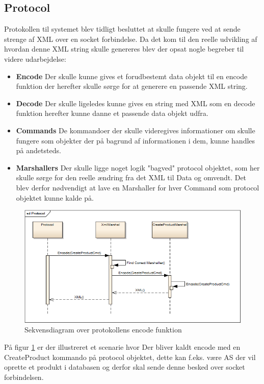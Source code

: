 \subsection{Protocol}\label{PROTOKOL}
Protokollen til systemet blev tidligt besluttet at skulle fungere ved at sende strenge af XML over en socket forbindelse. Da det kom til den reelle udvikling af hvordan denne XML string skulle genereres blev der opsat nogle begreber til videre udarbejdelse:

\begin{itemize}
\item \textbf{Encode} Der skulle kunne gives et forudbestemt data objekt til en encode funktion der herefter skulle sørge for at generere en passende XML string. 
\item \textbf{Decode} Der skulle ligeledes kunne gives en string med XML som en decode funktion herefter kunne danne et passende data objekt udfra. 
\item \textbf{Commands} De kommandoer der skulle videregives informationer om skulle fungere som objekter der på bagrund af informationen i dem, kunne handles på andetsteds.
\item \textbf{Marshallers} Der skulle ligge noget logik "bagved" protocol objektet, som her skulle sørge for den reelle ændring fra det XML til Data og omvendt. Det blev derfor nødvendigt at lave en Marshaller for hver Command som protocol objektet kunne kalde på.
\end{itemize}

\begin{figure}[H]
    \centering
    \includegraphics[width=1.0\textwidth]{Systemdesign/SharedLib/Images/Protokol/Protocol_Sek.png}
    \caption{Sekvensdiagram over protokollens encode funktion}
    \label{fig:protocolSek}
\end{figure}

På figur \ref{fig:protocolSek} er der illustreret et scenarie hvor Der bliver kaldt encode med en CreateProduct kommando på protocol objektet, dette kan f.eks. være \gls{AS} der vil oprette et produkt i databasen og derfor skal sende denne besked over socket forbindelsen.

